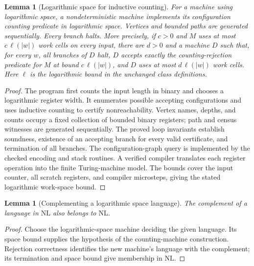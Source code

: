 \documentclass[11pt]{article}
\newtheorem{lemma}[theorem]{Lemma}
\theoremstyle{definition}
\begin{document}
\begin{lemma}[Logarithmic space for inductive counting]\leavevmode
For a machine using logarithmic space, a nondeterministic machine implements
its configuration counting predicate in logarithmic space. Vertices and
bounded paths are generated sequentially. Every branch halts.
More precisely, if $c>0$ and $M$ uses at most $c\,\ell(|w|)$ work cells on every input, there are $d>0$ and a machine $D$ such that, for every $w$, all branches of $D$ halt, $D$ accepts exactly the counting-rejection predicate for $M$ at bound $c\,\ell(|w|)$, and $D$ uses at most $d\,\ell(|w|)$ work cells. Here $\ell$ is the logarithmic bound in the unchanged class definitions.
\end{lemma}
\begin{proof}\leavevmode
The program first counts the input length in binary and chooses a logarithmic register width. It enumerates possible accepting configurations and uses inductive counting to certify nonreachability. Vertex names, depths, and counts occupy a fixed collection of bounded binary registers; path and census witnesses are generated sequentially. The proved loop invariants establish soundness, existence of an accepting branch for every valid certificate, and termination of all branches. The configuration-graph query is implemented by the checked encoding and stack routines. A verified compiler translates each register operation into the finite Turing-machine model. The bounds cover the input counter, all scratch registers, and compiler microsteps, giving the stated logarithmic work-space bound.\qedhere
\end{proof}

\begin{lemma}[Complementing a logarithmic space language]\leavevmode
The complement of a language in $\mathrm{NL}$ also belongs to $\mathrm{NL}$.

\end{lemma}
\begin{proof}\leavevmode
Choose the logarithmic-space machine deciding the given language. Its space bound supplies the hypothesis of the counting-machine construction. Rejection correctness identifies the new machine's language with the complement; its termination and space bound give membership in $\mathrm{NL}$.\qedhere
\end{proof}
\end{document}
